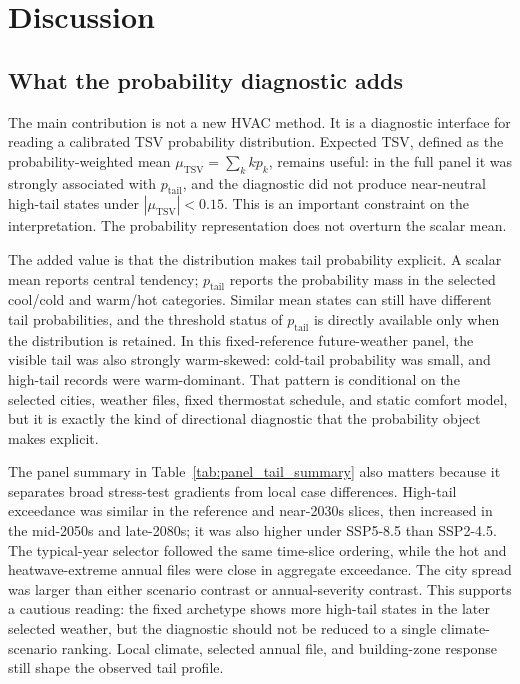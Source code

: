 \section{Discussion}\label{discuss}

\subsection{What the probability diagnostic adds}

The main contribution is not a new HVAC method. It is a diagnostic interface for reading a calibrated TSV probability distribution. Expected TSV, defined as the probability-weighted mean $\mu_{\mathrm{TSV}}=\sum_k k p_k$, remains useful: in the full panel it was strongly associated with $p_{\mathrm{tail}}$, and the diagnostic did not produce near-neutral high-tail states under $|\mu_{\mathrm{TSV}}|<0.15$. This is an important constraint on the interpretation. The probability representation does not overturn the scalar mean.

The added value is that the distribution makes tail probability explicit. A scalar mean reports central tendency; $p_{\mathrm{tail}}$ reports the probability mass in the selected cool/cold and warm/hot categories. Similar mean states can still have different tail probabilities, and the threshold status of $p_{\mathrm{tail}}$ is directly available only when the distribution is retained. In this fixed-reference future-weather panel, the visible tail was also strongly warm-skewed: cold-tail probability was small, and high-tail records were warm-dominant. That pattern is conditional on the selected cities, weather files, fixed thermostat schedule, and static comfort model, but it is exactly the kind of directional diagnostic that the probability object makes explicit.

The panel summary in Table~\ref{tab:panel_tail_summary} also matters because it separates broad stress-test gradients from local case differences. High-tail exceedance was similar in the reference and near-2030s slices, then increased in the mid-2050s and late-2080s; it was also higher under SSP5-8.5 than SSP2-4.5. The typical-year selector followed the same time-slice ordering, while the hot and heatwave-extreme annual files were close in aggregate exceedance. The city spread was larger than either scenario contrast or annual-severity contrast. This supports a cautious reading: the fixed archetype shows more high-tail states in the later selected weather, but the diagnostic should not be reduced to a single climate-scenario ranking. Local climate, selected annual file, and building-zone response still shape the observed tail profile.

